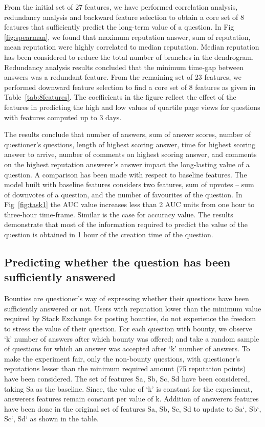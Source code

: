 From the initial set of 27 features, we have performed correlation analysis, redundancy analysis and backward feature selection to obtain a core set of 8 features that sufficiently predict the long-term value of a question. In Fig \ref{fig:spearman}, we found that maximum reputation answer, sum of reputation, mean reputation were highly correlated to median reputation. Median reputation has been considered to reduce the total number of branches in the dendrogram. Redundancy analysis results concluded that the minimum time-gap between answers was a redundant feature. From the remaining set of 23 features, we performed downward feature selection to find a core set of 8 features as given in Table~\ref{tab:8features}. The coefficients in the figure reflect the effect of the features in predicting the high and low values of quartile page views for questions with features computed up to 3 days.

The results conclude that number of answers, sum of answer scores, number of questioner’s questions, length of highest scoring answer, time for highest scoring answer to arrive, number of comments on highest scoring answer, and comments on the highest reputation answerer’s answer impact the long-lasting value of a question. 
A comparison has been made with respect to baseline features. The model built with baseline features considers two features, sum of upvotes – sum of downvotes of a question, and the number of favourites of the question. 
In Fig~\ref{fig:task1} the AUC value increases less than 2 AUC units from one hour to three-hour time-frame. Similar is the case for accuracy value. The results demonstrate that most of the information required to predict the value of the question is obtained in 1 hour of the creation time of the question. 

\subsection{Predicting whether the question has been sufficiently answered}
Bounties are questioner’s way of expressing whether their questions have been sufficiently answered or not. Users with reputation lower than the minimum value required by Stack Exchange for posting bounties, do not experience the freedom to stress the value of their question.
For each question with bounty, we observe ‘k’ number of answers after which bounty was offered; and take a random sample of questions for which an answer was accepted after ‘k’ number of answers. To make the experiment fair, only the non-bounty questions, with questioner’s reputations lesser than the minimum required amount (75 reputation points) have been considered. 
The set of features Sa, Sb, Sc, Sd have been considered, taking Sa as the baseline. Since, the value of ‘k’ is constant for the experiment, answerers features remain constant per value of k. Addition of answerers features have been done in the original set of features Sa, Sb, Sc, Sd to update to Sa`, Sb`, Sc`, Sd` as shown in the table.

